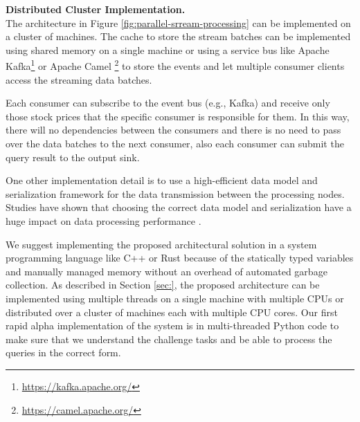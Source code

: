 

    
\textbf{Distributed Cluster Implementation.}\\
The architecture in Figure \ref{fig:parallel-srream-processing} can be implemented on a cluster of machines. The cache to store the stream batches can be implemented using shared memory on a single machine or using a service bus like Apache Kafka\footnote{\url{https://kafka.apache.org/}} or Apache Camel \footnote{\url{https://camel.apache.org/}} to store 
the events and let multiple consumer clients access the streaming data batches.  

Each consumer can subscribe to the event bus (e.g., Kafka) and receive only those stock prices that the specific consumer is responsible 
for them. In this way, there will no dependencies between the consumers and there is no need to pass over the data batches to the next 
consumer, also each consumer can submit the query result to the output sink.  

One other implementation detail is to use a high-efficient data model and serialization framework for the data transmission between 
the processing nodes. Studies have shown that choosing the correct data model and serialization have a huge impact on data 
processing performance \cite{DBLP:conf/cloud/SikdarTJ17}. 

We suggest implementing the proposed architectural solution in a system programming language like C++ or Rust because of the statically typed variables and manually managed memory without an overhead of automated garbage collection. As described in Section \ref{sec:}, the proposed architecture can be implemented using multiple threads on a single machine with multiple CPUs or distributed over a cluster of machines each with multiple CPU cores. Our first rapid alpha implementation of the system is in multi-threaded Python code to make sure that we understand the challenge tasks and be able to process the queries in the correct form.